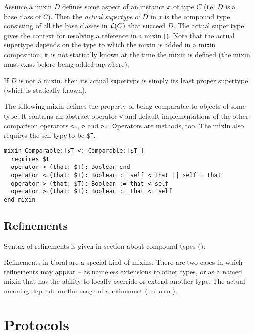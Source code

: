 Assume a mixin $D$ defines some aspect of an instance $x$ of type $C$ (i.e. $D$ is a base class of $C$). Then the {\em actual supertype} of $D$ in $x$ is the compound type consisting of all the base classes in ${\cal L}(C)$ that succeed $D$. The actual super type gives the context for resolving a  reference in a mixin (). Note that the actual supertype depends on the type to which the mixin is added in a mixin composition; it is not statically known at the time the mixin is defined (the mixin must exist before being added anywhere). 

If $D$ is not a mixin, then its actual supertype is simply its least proper supertype (which is statically known). 

\example The following mixin defines the property of being comparable to objects of some type. It contains an abstract operator \lstinline!<! and default implementations of the other comparison operators \lstinline!<=!, \lstinline!>! and \lstinline!>=!. Operators are methods, too. The mixin also requires the self-type to be \lstinline[mathescape=false]!$T!. 
\begin{lstlisting}[mathescape=false]
mixin Comparable:[$T <: Comparable:[$T]]
  requires $T
  operator < (that: $T): Boolean end
  operator <=(that: $T): Boolean := self < that || self = that
  operator > (that: $T): Boolean := that < self
  operator >=(that: $T): Boolean := that <= self
end mixin
\end{lstlisting}

\subsection{Refinements}
\label{sec:refinements}

Syntax of refinements is given in section about compound types (). 

Refinements in Coral are a special kind of mixins. There are two cases in which refinements may appear -- as nameless extensions to other types, or as a named mixin that has the ability to locally override or extend another type. The actual meaning depends on the usage of a refinement (see also ).


\section{Protocols}
\label{sec:protocols}

